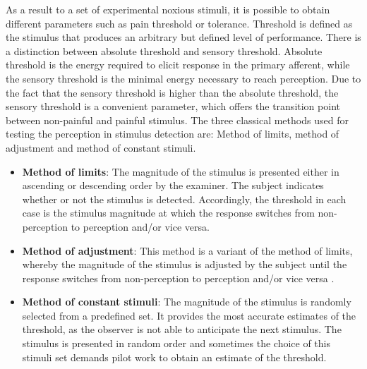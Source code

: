 As a result to a set of experimental noxious stimuli, it is possible to obtain different parameters such as pain threshold or tolerance. Threshold is defined as the stimulus that produces an arbitrary but defined level of performance. There is a distinction between absolute threshold and sensory threshold. Absolute threshold is the energy required to elicit response in the primary afferent, while the sensory threshold is the minimal energy necessary to reach perception. Due to the fact that the sensory threshold is higher than the absolute threshold, the sensory threshold is a convenient parameter, which offers the transition point between non-painful and painful stimulus. \cite{Yarnitsky2006} 
The three classical methods used for testing the perception in stimulus detection are: Method of limits, method of adjustment and method of constant stimuli. \cite{Treutwein1995}
\begin{itemize}
	
	\item \textbf{Method of limits}: The magnitude of the stimulus is presented either in ascending or descending order by the examiner. The subject indicates whether or not the stimulus is detected. Accordingly, the threshold in each case is the stimulus magnitude at which the response switches from non-perception to perception and/or vice versa. \cite{Kingdom2016}
	\item \textbf{Method of adjustment}: This method is a variant of the method of limits, whereby the magnitude of the stimulus is adjusted by the subject until the response switches from non-perception to perception and/or vice versa \cite{Kingdom2016}. %
	\item \textbf{Method of constant stimuli}: The magnitude of the stimulus is randomly selected from a predefined set. %
	It provides the most accurate estimates of the threshold, as the observer is not able to anticipate the next stimulus. The stimulus is presented in random order and sometimes the choice of this stimuli set demands pilot work to obtain an estimate of the threshold. \cite{Kingdom2016}
\end{itemize}

